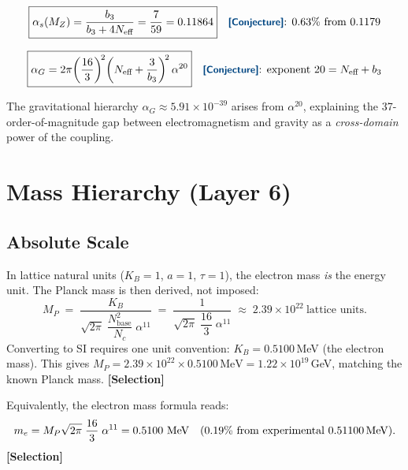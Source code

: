 \documentclass[12pt]{article}
\theoremstyle{definition}
\theoremstyle{remark}
\newcommand{\epi}[1]{\textnormal{{\small\sffamily\bfseries\color{ftdblue}[#1]}}}
\begin{document}
\begin{equation}
\boxed{\alpha_s(M_Z) = \frac{b_3}{b_3 + 4N_\text{eff}} = \frac{7}{59} = 0.11864}
\quad\text{\epi{Conjecture}: 0.63\% from 0.1179}
\end{equation}

\begin{equation}
\boxed{\alpha_G = 2\pi\!\left(\frac{16}{3}\right)^{\!2}\!\left(N_\text{eff} + \frac{3}{b_3}\right)^{\!2}\alpha^{20}}
\quad\text{\epi{Conjecture}: exponent } 20 = N_\text{eff} + b_3
\label{eq:alphaG}
\end{equation}

\noindent The gravitational hierarchy $\alpha_G \approx 5.91\times 10^{-39}$
arises from $\alpha^{20}$, explaining the 37-order-of-magnitude gap between
electromagnetism and gravity as a \emph{cross-domain} power of the coupling.

\section{Mass Hierarchy (Layer 6)}

\subsection{Absolute Scale}

\noindent In lattice natural units ($K_B = 1$, $a = 1$, $\tau = 1$), the electron mass \emph{is} the energy unit. The Planck mass is then derived, not imposed:
\begin{equation}
\boxed{M_P \;=\; \frac{K_B}{\sqrt{2\pi}\;\dfrac{N_\text{base}^2}{N_c}\;\alpha^{11}}
\;=\; \frac{1}{\sqrt{2\pi}\;\dfrac{16}{3}\;\alpha^{11}} \;\approx\; 2.39\times 10^{22}~\text{lattice units.}}
\label{eq:mp}
\end{equation}
Converting to SI requires one unit convention: $K_B = 0.5100$\,MeV (the electron mass). This gives $M_P = 2.39\times 10^{22} \times 0.5100\,\text{MeV} = 1.22\times 10^{19}$\,GeV, matching the known Planck mass. \epi{Selection}

Equivalently, the electron mass formula reads:
\begin{equation}
m_e = M_P\sqrt{2\pi}\;\frac{16}{3}\;\alpha^{11} = 0.5100~\text{MeV} \quad\text{(0.19\% from experimental 0.51100\,MeV).}
\label{eq:me}
\end{equation}
\epi{Selection}
\end{document}
